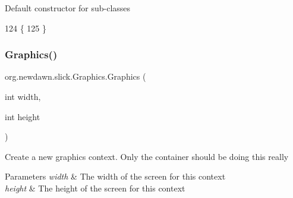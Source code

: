 Default constructor for sub-\/classes 
\begin{DoxyCode}
124                       \{ 
125     \}
\end{DoxyCode}
\mbox{\label{classorg_1_1newdawn_1_1slick_1_1_graphics_ab256b233dcf0217a0b4f0577d18b990e}} 
\subsubsection{\texorpdfstring{Graphics()}{Graphics()}\hspace{0.1cm}{\footnotesize\ttfamily [2/2]}}
{\footnotesize\ttfamily org.\+newdawn.\+slick.\+Graphics.\+Graphics (\begin{DoxyParamCaption}\item[{int}]{width,  }\item[{int}]{height }\end{DoxyParamCaption})\hspace{0.3cm}{\ttfamily [inline]}}

Create a new graphics context. Only the container should be doing this really


\begin{DoxyParams}{Parameters}
{\em width} & The width of the screen for this context \\
\hline
{\em height} & The height of the screen for this context \\
\hline
\end{DoxyParams}

